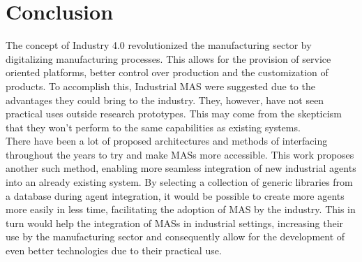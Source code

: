 

\glsresetall

\chapter{Conclusion}
\label{cha:conclusion}

The concept of Industry 4.0 revolutionized the manufacturing sector by digitalizing manufacturing processes. This allows for the provision of service oriented platforms, better control over production and the customization of products. To accomplish this, Industrial \gls{MAS} were suggested due to the advantages they could bring to the industry. They, however, have not seen practical uses outside research prototypes. This may come from the skepticism that they won't perform to the same capabilities as existing systems.\\

There have been a lot of proposed architectures and methods of interfacing throughout the years to try and make \gls{MAS}s more accessible. This work proposes another such method, enabling more seamless integration of new industrial agents into an already existing system. By selecting a collection of generic libraries from a database during agent integration, it would be possible to create more agents more easily in less time, facilitating the adoption of \gls{MAS} by the industry. This in turn would help the integration of \gls{MAS}s in industrial settings, increasing their use by the manufacturing sector and consequently allow for the development of even better technologies due to their practical use.